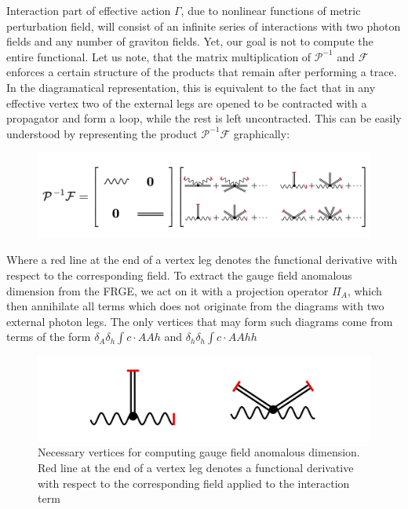 \documentclass[11pt, a4paper]{article}
\begin{document}
Interaction part of effective action $\Gamma$, due to nonlinear functions of metric perturbation field, will
consist of an infinite series of interactions with two photon fields and any number of graviton fields. Yet, our goal is not to compute the entire functional.
Let us note, that the matrix multiplication of $\mathcal{P}^{-1}$ and $\mathcal{F}$ enforces a certain structure of the products that remain after performing a trace.
In the diagramatical representation, this is equivalent to the fact that in any effective vertex two of the external legs are opened to be contracted with a propagator and form a loop, while the rest is left uncontracted. This can be easily understood by representing the product $\mathcal{P}^{-1} \mathcal{F}$ graphically:
\begin{figure}[H]
    \includegraphics[width=1\textwidth]{./figures/drawing.png}
    \caption*{}
\end{figure}
Where a red line at the end of a vertex leg denotes the functional derivative with respect to the corresponding field.
To extract the gauge field anomalous dimension from the FRGE, we act on it with
a projection operator $\varPi_A$, which then annihilate all terms which does not originate from the diagrams with two external photon legs.
The only vertices that may form such diagrams come from terms of the form $\delta_{A}\delta_h \int c \cdot AAh$ and $\delta_h \delta_h \int c \cdot AAhh$
\begin{figure}[H]
    \includegraphics[width=1\textwidth]{./figures/vertices.png}
    \caption{Necessary vertices for computing gauge field anomalous dimension. Red line at the end of a vertex leg denotes a functional derivative with respect to the corresponding field applied to the interaction term}
\end{figure}
\end{document}
